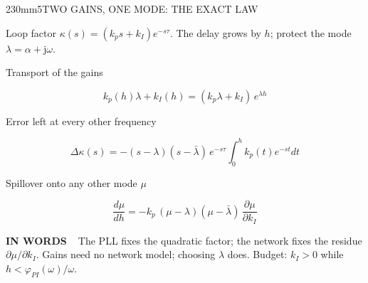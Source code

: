 \begin{DensePanel}{230mm}{5}{TWO GAINS, ONE MODE: THE EXACT LAW}
  {\DenseBody Loop factor $\kappa(s)=(k_p s+k_I)e^{-s\tau}$. The delay grows by $h$; protect the mode $\lambda=\alpha+\mathrm{j}\omega$.\par}
  \vspace{1mm}
  {\DenseHead Transport of the gains\par}
  {\HeroEquation\color{IASBlue}\[
    k_p(h)\lambda+k_I(h)=(k_p\lambda+k_I)\,e^{\lambda h}
  \]}
  \vspace{-2mm}
  {\DenseHead Error left at every other frequency\par}
  {\DenseEq\color{IASBlue}\[
    \Delta\kappa(s)=-(s-\lambda)(s-\bar\lambda)\,e^{-s\tau}\!\!\int_0^h\!\! k_p(t)e^{-st}dt
  \]}
  \vspace{-2mm}
  {\DenseHead Spillover onto any other mode $\mu$\par}
  {\DenseEq\color{IASBlue}\[
    \frac{d\mu}{dh}=-k_p\,(\mu-\lambda)(\mu-\bar\lambda)\,\frac{\partial\mu}{\partial k_I}
  \]}
  \vspace{-1mm}
  \begin{DenseWords}\textbf{\color{IASGold!65!black}IN WORDS\ \ }The PLL fixes the quadratic factor; the network fixes the residue $\partial\mu/\partial k_I$. Gains need no network model; choosing $\lambda$ does. Budget: $k_I>0$ while $h<\varphi_{PI}(\omega)/\omega$.\end{DenseWords}
\end{DensePanel}
